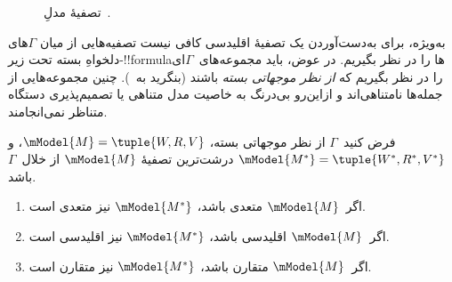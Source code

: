 \documentclass[../../../include/open-logic-section]{subfiles}
\begin{document}
\begin{figure}[ht]
  \centering
  \caption{تصفیهٔ مدلِ~.}
\end{figure}

به‌ویژه، برای به‌دست‌آوردن یک تصفیهٔ اقلیدسی کافی نیست تصفیه‌هایی از میان
$\Gamma$های دلخواهِ بسته تحت زیر-!!{formula}ها را در نظر بگیریم. در عوض،
باید مجموعه‌های~$\Gamma$ای را در نظر بگیریم که \emph{از نظر موجهاتی بسته}
باشند (بنگرید به~). چنین مجموعه‌هایی از
جمله‌ها نامتناهی‌اند و ازاین‌رو بی‌درنگ به خاصیت مدل متناهی یا
تصمیم‌پذیری دستگاه متناظر نمی‌انجامند.

\begin{thm}
  فرض کنید~$\Gamma$ از نظر موجهاتی بسته،
  $\mModel{M}=\tuple{W,R,V}$، و
  $\mModel{M^*} = \tuple{W^*,R^*,V^*}$ درشت‌ترین تصفیهٔ
  $\mModel{M}$ از خلال~$\Gamma$ باشد.
  \begin{enumerate}
  \item اگر~$\mModel{M}$ متعدی باشد، $\mModel{M^*}$ نیز متعدی است.
  \item اگر~$\mModel{M}$ اقلیدسی باشد، $\mModel{M^*}$ نیز اقلیدسی است.
  \item اگر~$\mModel{M}$ متقارن باشد، $\mModel{M^*}$ نیز متقارن است.
  \end{enumerate}
\end{thm}
\end{document}

